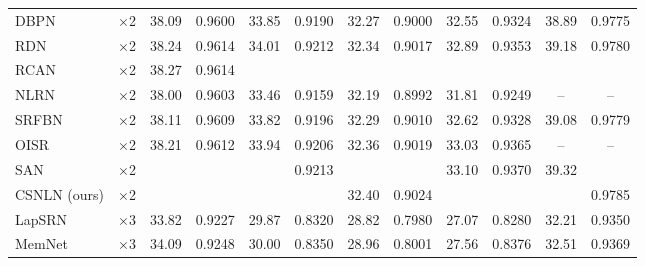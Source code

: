 \documentclass[10pt,twocolumn,letterpaper]{article}
\begin{document}
\begin{table*}[thbp]
\begin{center}
\begin{tabular}{|l|c|c|c|c|c|c|c|c|c|c|c|}
\\
DBPN~\cite{haris2018deep} & $\times$2 
& 38.09
 & 0.9600
  & 33.85
   & 0.9190
    & 32.27
     & 0.9000
      & 32.55
       & 0.9324
        & 38.89
         & 0.9775        
\\
RDN~\cite{zhang2018residual} & $\times$2 
& 38.24
 & 0.9614
  & 34.01
   & 0.9212
    & 32.34
     & 0.9017
      & 32.89
       & 0.9353
        & 39.18
         & 0.9780
         
\\


RCAN~\cite{zhang2018image} & $\times$2 
& {38.27}
 & {0.9614}
  & \color{red}{34.12}
   & \color{blue}{0.9216}
    & \color{blue}{32.41}
     & \color{blue}{0.9027}
      & \color{red}{33.34}
       & \color{blue}{0.9384}
        & \color{red}{39.44}
         & \color{blue}{0.9786}
\\       
NLRN~\cite{liu2018non}& $\times$2 
& {38.00}
 & {0.9603}
  & {33.46}
   & {0.9159}
    & {32.19}
     & {0.8992}
      & {31.81}
       & {0.9249}
        & {--}
         & {--}
\\
SRFBN~\cite{li2019feedback}& $\times$2 
& {38.11}
 & {0.9609}
  & {33.82}
   & {0.9196}
    & {32.29}
     & {0.9010}
      & {32.62}
       & {0.9328}
        & {39.08}
         &{0.9779}
\\
 OISR~\cite{he2019ode} & $\times$2 
& {38.21}
 & {0.9612}
  & {33.94}
   & {0.9206}
    & {32.36}
     & {0.9019}
      & {33.03}
       & {0.9365}
        &--
         & --      
\\
SAN~\cite{dai2019second} & $\times$2 
& \color{red}{38.31}
 & \color{red}{0.9620}
  & \color{blue}{34.07}
   & {0.9213}
    & \color{red}{32.42}
     & \color{red}{0.9028}
      & {33.10}
       & {0.9370}
        & {39.32}
         & \color{red}{0.9792}
\\
CSNLN (ours) & $\times$2 
& \color{blue}{38.28}
 & \color{blue}{0.9616}
  & \color{red}{34.12}
   & \color{red}{0.9223}
    & {32.40}
     & {0.9024}
      & \color{blue}{33.25}
       & \color{red}{0.9386}
        & \color{blue}{39.37}
         & {0.9785}
\\

                 
\hline
\hline

LapSRN~\cite{lai2017deep} & $\times$3 
& 33.82
 & 0.9227
  & 29.87
   & 0.8320
    & 28.82
     & 0.7980
      & 27.07
       & 0.8280
        & 32.21
         & 0.9350
                   
\\
MemNet~\cite{tai2017memnet} & $\times$3 
& 34.09
 & 0.9248
  & 30.00
   & 0.8350
    & 28.96
     & 0.8001
      & 27.56
       & 0.8376
        & 32.51
         & 0.9369
                   

\end{tabular}
\end{center}
\end{table*}
\end{document}
